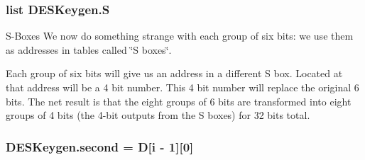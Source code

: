 \subsubsection[{\texorpdfstring{S}{S}}]{\setlength{\rightskip}{0pt plus 5cm}list D\+E\+S\+Keygen.\+S}\hypertarget{namespaceDESKeygen_a6da8b8d78caa50ef61de1ccc5413dec7}{}\label{namespaceDESKeygen_a6da8b8d78caa50ef61de1ccc5413dec7}


S-\/\+Boxes We now do something strange with each group of six bits\+: we use them as addresses in tables called \char`\"{}\+S boxes\char`\"{}. 

Each group of six bits will give us an address in a different S box. Located at that address will be a 4 bit number. This 4 bit number will replace the original 6 bits. The net result is that the eight groups of 6 bits are transformed into eight groups of 4 bits (the 4-\/bit outputs from the S boxes) for 32 bits total. 
\subsubsection[{\texorpdfstring{second}{second}}]{\setlength{\rightskip}{0pt plus 5cm}D\+E\+S\+Keygen.\+second = {\bf D}\mbox{[}i -\/ 1\mbox{]}\mbox{[}0\mbox{]}}\hypertarget{namespaceDESKeygen_a90b4cb951d052552ff184daf0e2428b2}{}\label{namespaceDESKeygen_a90b4cb951d052552ff184daf0e2428b2}
